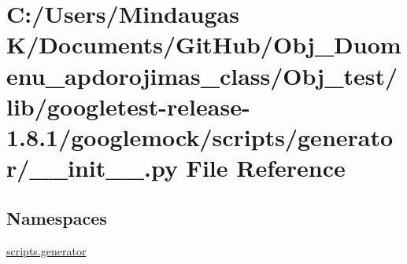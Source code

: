 \hypertarget{_obj__test_2lib_2googletest-release-1_88_81_2googlemock_2scripts_2generator_2____init_____8py}{}\section{C\+:/\+Users/\+Mindaugas K/\+Documents/\+Git\+Hub/\+Obj\+\_\+\+Duomenu\+\_\+apdorojimas\+\_\+class/\+Obj\+\_\+test/lib/googletest-\/release-\/1.8.1/googlemock/scripts/generator/\+\_\+\+\_\+init\+\_\+\+\_\+.py File Reference}
\label{_obj__test_2lib_2googletest-release-1_88_81_2googlemock_2scripts_2generator_2____init_____8py}
\subsection*{Namespaces}
\begin{DoxyCompactItemize}
\item 
 \mbox{\hyperlink{namespacescripts_1_1generator}{scripts.\+generator}}
\end{DoxyCompactItemize}
